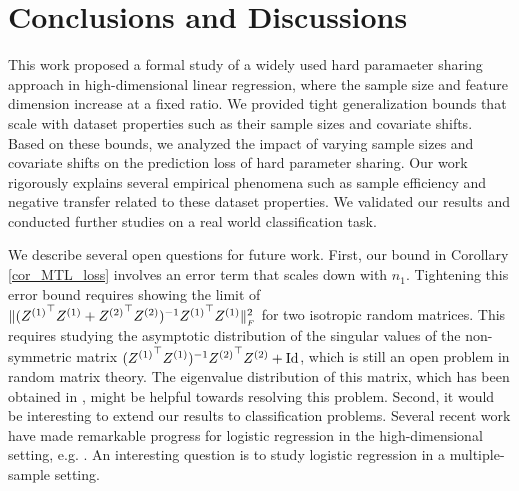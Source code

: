 \section{Conclusions and Discussions}\label{sec_conclude}

This work proposed a formal study of a widely used hard paramaeter sharing approach in high-dimensional linear regression, where the sample size and feature dimension increase at a fixed ratio.
We provided tight generalization bounds that scale with dataset properties such as their sample sizes and covariate shifts.
Based on these bounds, we analyzed the impact of varying sample sizes and covariate shifts on the prediction loss of hard parameter sharing.
Our work rigorously explains several empirical phenomena such as sample efficiency and negative transfer related to these dataset properties.
We validated our results and conducted further studies on a real world classification task.

We describe several open questions for future work.
First, our bound in Corollary \ref{cor_MTL_loss} involves an error term that scales down with $n_1$.
Tightening this error bound requires showing the limit of $\|({Z^{(1)}}^{\top} Z^{(1)} + {Z^{(2)}}^{\top} Z^{(2)})^{-1} {Z^{(1)}}^{\top} Z^{(1)}\|_{_{F}}^2$ for two isotropic random matrices.
This requires studying the asymptotic distribution of the {singular values} of the non-symmetric matrix $({Z^{(1)}}^{\top} Z^{(1)})^{-1}{Z^{(2)}}^{\top} Z^{(2)}+\operatorname{Id}$, which is still an open problem in random matrix theory.  
The eigenvalue distribution of this matrix, which has been obtained in \citet{Fmatrix}, might be helpful towards resolving this problem.
Second, it would be interesting to extend our results to classification problems.
Several recent work have made remarkable progress for logistic regression in the high-dimensional  setting, e.g. \cite{sur2019modern}.
An interesting question is to study logistic regression in a multiple-sample setting.
